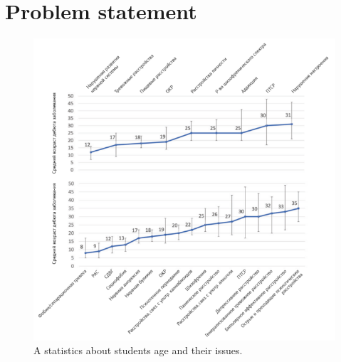 \newpage
\section{Problem statement}\label{prblstatm}
\begin{figure}[ht]\label{fig:sstats}
  \centering
  \includegraphics[width=0.8\linewidth]{figures/Students_issue.png}
  \caption{A statistics about students age and their issues.}
\end{figure}

